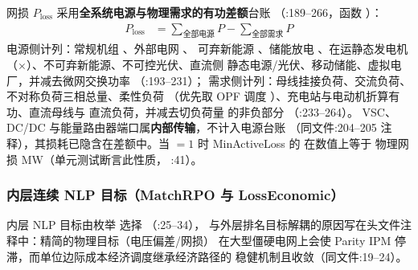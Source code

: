 网损 $P_{\mathrm{loss}}$ 采用\textbf{全系统电源与物理需求的有功差额}台账
（:189--266，函数
）：
\begin{align*}
P_{\mathrm{loss}} &= \sum_{\text{全部电源}} P - \sum_{\text{全部需求}} P
\end{align*}
电源侧计列：常规机组 、外部电网 、
可弃新能源 、储能放电 、在运静态发电机
（$\times$）、不可弃新能源、不可控光伏、直流侧
静态电源/光伏、移动储能、虚拟电厂，并减去微网交换功率
（:193--231）；
需求侧计列：母线挂接负荷、交流负荷、不对称负荷三相总量、柔性负荷
（优先取 OPF 调度 ）、充电站与电动机折算有功、直流母线与
直流负荷，并减去切负荷量  的非负部分
（:233--264）。
VSC、DC/DC 与能量路由器端口属\textbf{内部传输}，不计入电源台账
（同文件:204--205 注释），其损耗已隐含在差额中。当
$=1$ 时 MinActiveLoss 的  在数值上等于
物理网损 MW（单元测试断言此性质，
:41）。

\subsubsection*{内层连续 NLP 目标（MatchRPO 与 LossEconomic）}
内层 NLP 目标由枚举  选择
（:25--34），
与外层排名目标解耦的原因写在头文件注释中：精简的物理目标（电压偏差/网损）
在大型僵硬电网上会使 Parity IPM 停滞，而单位边际成本经济调度继承经济路径的
稳健机制且收敛（同文件:19--24）。

